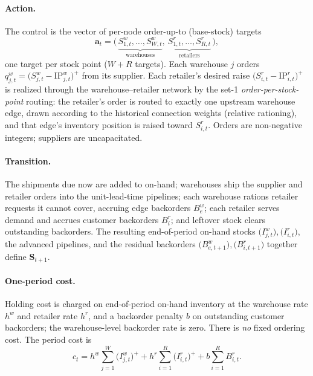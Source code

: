 \documentclass[11pt]{article}
\begin{document}
\paragraph{Action.}
The control is the vector of per-node order-up-to (base-stock) targets
\begin{equation*}
  \mathbf a_t = \big(\,\underbrace{S^w_{1,t},\dots,S^w_{W,t}}_{\text{warehouses}},\
  \underbrace{S^r_{1,t},\dots,S^r_{R,t}}_{\text{retailers}}\,\big),
\end{equation*}
one target per stock point ($W+R$ targets). Each warehouse $j$ orders
$q^w_{j,t}=\big(S^w_{j,t}-\mathrm{IP}^w_{j,t}\big)^+$ from its supplier. Each retailer's desired raise
$\big(S^r_{i,t}-\mathrm{IP}^r_{i,t}\big)^+$ is realized through the warehouse--retailer network by the
set-1 \emph{order-per-stock-point} routing: the retailer's order is routed to exactly one upstream
warehouse edge, drawn according to the historical connection weights (relative rationing), and that
edge's inventory position is raised toward $S^r_{i,t}$. Orders are non-negative integers; suppliers are
uncapacitated.

\paragraph{Transition.}
The shipments due now are added to on-hand; warehouses ship the supplier and retailer orders into the
unit-lead-time pipelines; each warehouse rations retailer requests it cannot cover, accruing edge
backorders $B^w_{e}$; each retailer serves demand and accrues customer backorders $B^r_{i}$; and
leftover stock clears outstanding backorders. The resulting end-of-period on-hand stocks
$\big(I^w_{j,t}\big),\big(I^r_{i,t}\big)$, the advanced pipelines, and the residual backorders
$\big(B^w_{e,t+1}\big),\big(B^r_{i,t+1}\big)$ together define $\mathbf S_{t+1}$.

\paragraph{One-period cost.}
Holding cost is charged on end-of-period on-hand inventory at the warehouse rate $h^w$ and retailer
rate $h^r$, and a backorder penalty $b$ on outstanding customer backorders; the warehouse-level
backorder rate is zero. There is \emph{no} fixed ordering cost. The period cost is
\begin{equation}
  c_t = h^w\sum_{j=1}^{W}\big(I^w_{j,t}\big)^+ + h^r\sum_{i=1}^{R}\big(I^r_{i,t}\big)^+
        + b\sum_{i=1}^{R} B^r_{i,t} .
  \label{eq:gbk-cost}
\end{equation}
\end{document}
